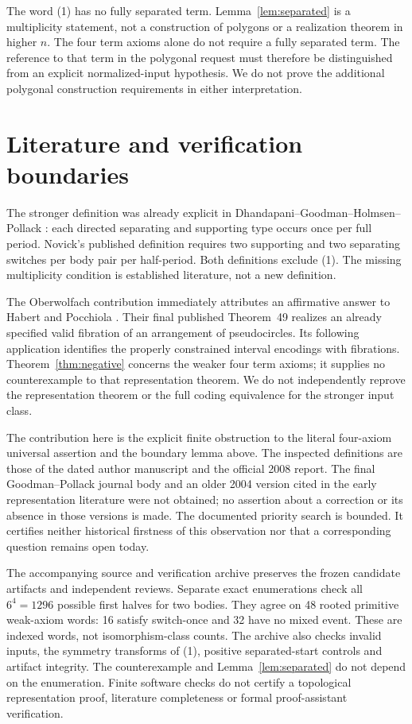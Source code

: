\documentclass[11pt]{article}
\begin{document}
The word (1) has no fully separated term. Lemma~\ref{lem:separated}
is a multiplicity statement, not a construction of polygons or a
realization theorem in higher $n$. The four term axioms alone do not
require a fully separated term. The reference to that term in the
polygonal request must therefore be distinguished from an explicit
normalized-input hypothesis. We do not prove the additional polygonal
construction requirements in either interpretation.

\section{Literature and verification boundaries}

The stronger definition was already explicit in
Dhandapani--Goodman--Holmsen--Pollack \cite[Section~2, p.~5]{DGHP}:
each directed separating and supporting type occurs once per full
period. Novick's published definition \cite[pp.~1060--1061]{Novick}
requires two supporting and two separating switches per body pair
per half-period. Both definitions exclude (1). The missing
multiplicity condition is established literature, not a new definition.

The Oberwolfach contribution immediately attributes an affirmative
answer to Habert and Pocchiola \cite[pp.~2492--2493]{OWR}.
Their final published Theorem~49 \cite[p.~624]{HP} realizes an already
specified valid fibration of an arrangement of pseudocircles.
Its following application identifies the properly constrained interval
encodings with fibrations. Theorem~\ref{thm:negative} concerns the weaker
four term axioms; it supplies no counterexample to that representation
theorem. We do not independently reprove the representation theorem or
the full coding equivalence for the stronger input class.

The contribution here is the explicit finite obstruction to the literal
four-axiom universal assertion and the boundary lemma above. The inspected
definitions are those of the dated author manuscript and the official
2008 report. The final Goodman--Pollack journal body and an older 2004 version
cited in the early representation literature were not obtained;
no assertion about a correction or its absence in those versions is made.
The documented priority search is bounded. It certifies neither historical
firstness of this observation nor that a corresponding question remains
open today.

The accompanying source and verification archive preserves the frozen
candidate artifacts and independent reviews. Separate exact enumerations
check all $6^4=1296$ possible first halves for two bodies. They agree on
48 rooted primitive weak-axiom words: 16 satisfy switch-once and 32 have
no mixed event. These are indexed words, not isomorphism-class counts.
The archive also checks invalid inputs, the symmetry transforms of (1),
positive separated-start controls and artifact integrity. The
counterexample and Lemma~\ref{lem:separated} do not depend on the enumeration.
Finite software checks do not certify a topological representation proof,
literature completeness or formal proof-assistant verification.
\end{document}
